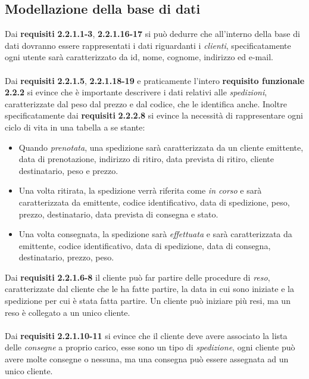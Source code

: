 \subsection{Modellazione della base di dati}
Dai \textbf{requisiti} \textbf{2.2.1.1-3}, \textbf{2.2.1.16-17} si può dedurre che all'interno della base di dati dovranno essere rappresentati
i dati riguardanti i \textit{clienti}, specificatamente ogni utente sarà caratterizzato da id, nome, cognome, indirizzo ed e-mail. 
\\\\
Dai \textbf{requisiti} \textbf{2.2.1.5}, \textbf{2.2.1.18-19} e praticamente l'intero \textbf{requisito funzionale }\textbf{2.2.2} si evince che è importante descrivere i dati relativi alle \textit{spedizioni}, caratterizzate dal peso dal prezzo e dal codice, che le identifica anche. Inoltre specificatamente dai \textbf{requisiti} \textbf{2.2.2.8} si evince la necessità di rappresentare ogni ciclo di vita in una tabella a se stante:
\begin{itemize}
	\item Quando \textit{prenotata}, una spedizione sarà caratterizzata da un cliente emittente, data di prenotazione, 
	indirizzo di ritiro, data prevista di ritiro, cliente destinatario, peso e prezzo.
	
	\item Una volta ritirata, la spedizione verrà riferita come \textit{in corso} e sarà caratterizzata da emittente, 
	codice identificativo, data di spedizione, peso, prezzo, destinatario, data prevista di consegna e stato.
	
	\item Una volta consegnata, la spedizione sarà \textit{effettuata} e sarà caratterizzata da emittente, codice identificativo, 
	data di spedizione, data di consegna, destinatario, prezzo, peso.
\end{itemize}  
Dai \textbf{requisiti} \textbf{2.2.1.6-8} il cliente può far partire delle procedure di \textit{reso}, caratterizzate dal cliente che le ha fatte partire, la data in cui sono iniziate e la spedizione per cui è stata fatta partire. Un cliente può iniziare più resi, ma un reso è collegato a un unico cliente.
\\\\
Dai \textbf{requisiti} \textbf{2.2.1.10-11} si evince che il cliente deve avere associato la lista delle \textit{consegne} a proprio carico,  esse sono un tipo di \textit{spedizione}, ogni cliente può avere molte consegne o nessuna, ma una consegna può essere assegnata ad un unico cliente.
